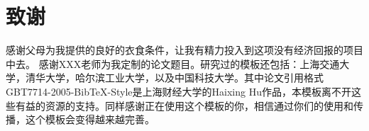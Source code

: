\section*{致谢}
感谢父母为我提供的良好的衣食条件，让我有精力投入到这项没有经济回报的项目中去。
感谢XXX老师为我定制的论文题目。研究过的模板还包括：上海交通大学，清华大学，哈尔滨工业大学，以及中国科技大学。其中论文引用格式GBT7714-2005-BibTeX-Style是上海财经大学的Haixing Hu作品，本模板离不开这些有益的资源的支持。同样感谢正在使用这个模板的你，相信通过你们的使用和传播，这个模板会变得越来越完善。